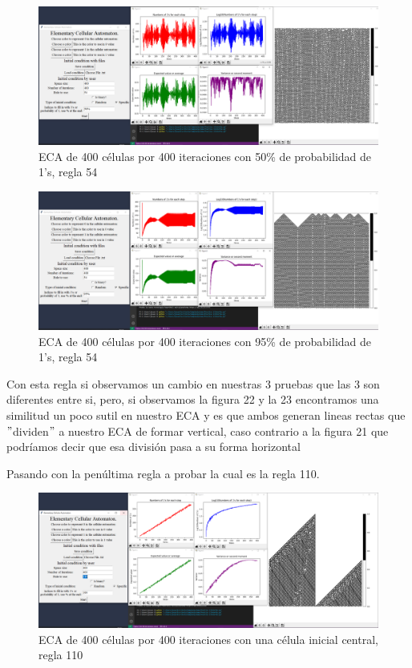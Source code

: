 \documentclass[11pt]{article}
\begin{document}
		\begin{figure}[H]
			\centering
			\includegraphics[scale=0.26]{resources/add11.png}
			\caption{ECA de 400 células por 400 iteraciones con 50\% de probabilidad de 1's, regla 54}								\label{fig:picture}
		\end{figure}
		\begin{figure}[H]
			\centering
			\includegraphics[scale=0.26]{resources/add12.png}
			\caption{ECA de 400 células por 400 iteraciones con 95\% de probabilidad de 1's, regla 54}								\label{fig:picture}
		\end{figure}
		Con esta regla si observamos un cambio en nuestras 3 pruebas que las 3 son diferentes entre si, pero, si observamos la figura 22 y la 23 encontramos una similitud un poco sutil en nuestro ECA y es que ambos generan lineas rectas que $"$dividen$"$ a nuestro ECA de formar vertical, caso contrario a la figura 21 que podríamos decir que esa división pasa a su forma horizontal\par 
		Pasando con la penúltima regla a probar la cual es la regla 110.
		\begin{figure}[H]
			\centering
			\includegraphics[scale=0.26]{resources/add13.png}
			\caption{ECA de 400 células por 400 iteraciones con una célula inicial central, regla 110}								\label{fig:picture}
		\end{figure}
\end{document}

